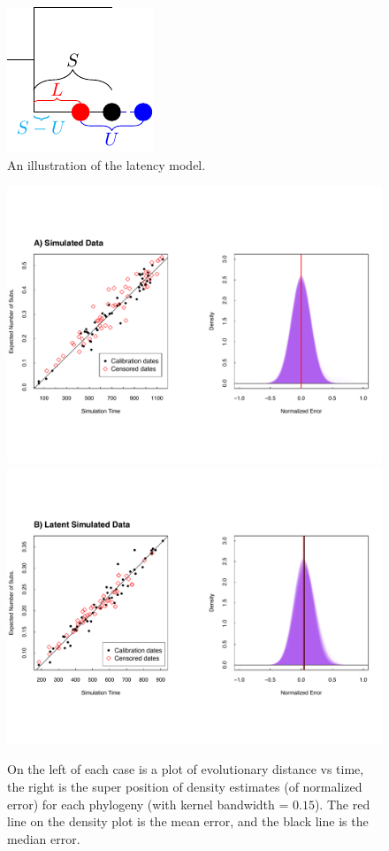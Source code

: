 \documentclass[12pt]{article}
\begin{document}
\begin{figure}[ht]
	\centering{}
	\includegraphics{figures/latency-model}
	\caption[Latency Model]{An illustration of the latency model.}
	\label{fig:latencymodel}
\end{figure}

\begin{figure}[p]
	\centering
	\includegraphics[width=\textwidth]{figures/simulated.pdf} 
	\includegraphics[width=\textwidth]{figures/simulated_latent.pdf}\\
	\caption[Simulated Data]{On the left of each case is a plot of evolutionary distance vs time, the right is the super position of density estimates (of normalized error) for each phylogeny (with kernel bandwidth = $0.15$). The red line on the density plot is the mean error, and the black line is the median error. }
	 \label{fig:results1}
\end{figure}
\end{document}
